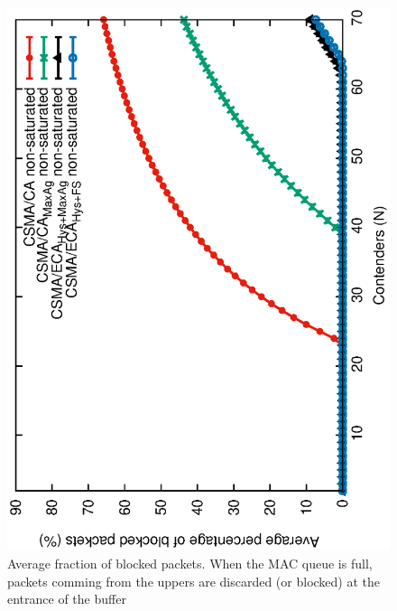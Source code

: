 	\begin{figure}[tb]
		\centering
		\includegraphics[width=0.7\linewidth,angle=-90]{figures/unsaturated/blockingProb-unsat/blocking-unsaturated-TON.eps}
		\caption{Average fraction of blocked packets. When the MAC queue is full, packets comming from the uppers are discarded (or blocked) at the entrance of the buffer}
		\label{fig:blocked-packets}
	\end{figure}	
	
	
%	
	
